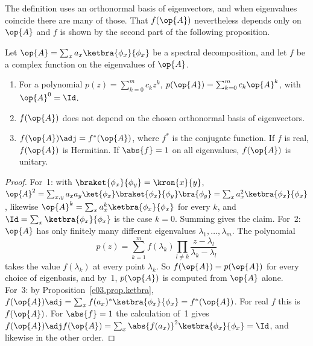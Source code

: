 
The definition uses an orthonormal basis of eigenvectors, and when eigenvalues coincide there are
many of those. That $f(\op{A})$ nevertheless depends only on $\op{A}$ and $f$ is shown by the
second part of the following proposition.

\begin{proposition}\label{c03.prop.funktion}
  Let $\op{A} = \sum_x a_x \ketbra{\phi_x}{\phi_x}$ be a spectral decomposition, and let $f$ be a
  complex function on the eigenvalues of $\op{A}$.
  \begin{enumerate}
    \item For a polynomial $p(z) = \sum_{k=0}^{m} c_k z^k$,
      $p(\op{A}) = \sum_{k=0}^{m} c_k \op{A}^k$, with $\op{A}^0 = \Id$.
    \item $f(\op{A})$ does not depend on the chosen orthonormal basis of eigenvectors.
    \item $f(\op{A})\adj = f^*(\op{A})$, where $f^*$ is the conjugate function. If $f$ is real,
      $f(\op{A})$ is Hermitian. If $\abs{f} = 1$ on all eigenvalues, $f(\op{A})$ is unitary.
  \end{enumerate}
\end{proposition}
\begin{proof}
  For~1: with $\braket{\phi_x}{\phi_y} = \kron{x}{y}$,
  $\op{A}^2 = \sum_{x,y} a_x a_y \ket{\phi_x}\braket{\phi_x}{\phi_y}\bra{\phi_y} = \sum_x a_x^2 \ketbra{\phi_x}{\phi_x}$,
  likewise $\op{A}^k = \sum_x a_x^k \ketbra{\phi_x}{\phi_x}$ for every $k$, and
  $\Id = \sum_x \ketbra{\phi_x}{\phi_x}$ is the case $k = 0$. Summing gives the claim.
  For~2: $\op{A}$ has only finitely many different eigenvalues $\lambda_1, \dots, \lambda_m$. The
  polynomial
  \begin{equation*}
    p(z) = \sum_{k=1}^{m} f(\lambda_k) \prod_{l \neq k} \frac{z - \lambda_l}{\lambda_k - \lambda_l}
  \end{equation*}
  takes the value $f(\lambda_k)$ at every point $\lambda_k$. So $f(\op{A}) = p(\op{A})$ for
  every choice of eigenbasis, and by~1, $p(\op{A})$ is computed from $\op{A}$ alone. For~3:
  by Proposition~\ref{c03.prop.ketbra},
  $f(\op{A})\adj = \sum_x f(a_x)^* \ketbra{\phi_x}{\phi_x} = f^*(\op{A})$. For real $f$ this is
  $f(\op{A})$. For $\abs{f} = 1$ the calculation of~1 gives
  $f(\op{A})\adj f(\op{A}) = \sum_x \abs{f(a_x)}^2 \ketbra{\phi_x}{\phi_x} = \Id$, and likewise in
  the other order.
\end{proof}

